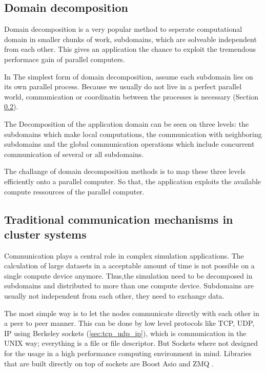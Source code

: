 \subsection{Domain decomposition}
\label{sec:domain_decomposition}
Domain decomposition is a very popular method to seperate
computational domain in smaller chunks of work, subdomains, which are
solveable independent from each other. This gives an application the
chance to exploit the tremendous performace gain of parallel
computers.

In The simplest form of domain decomposition, assume each subdomain
lies on its own parallel process. Because we usually do not live in a
perfect parallel world, communication or coordinatin between the
processes is necessary (Section \ref{sec:communication}).

The Decomposition of the application domain can be seen on three
levels: the subdomains which make local computations, the
communication with neighboring subdomains and the global communication
operations which include concurrent communication of several or all
subdomains.

The challange of domain decomposition methods is to map these three
levels efficiently onto a parallel computer. So that, the application
exploits the available compute ressources of the parallel computer.


\subsection{Traditional communication mechanisms in cluster systems}
\label{sec:communication}
Communication plays a central role in complex simulation
applications. The calculation of large datasets in a acceptable amount
of time is not possible on a single compute device anymore.
Thus,the simulation need to be decomposed in subdomains and
distributed to more than one compute device. Subdomains are usually not
independent from each other, they need to exchange data.

The most simple way is to let the nodes communicate directly with each
other in a peer to peer manner.  This can be done by low level
protocols like TCP, UDP, IP using Berkeley sockets
(\ref{sec:tcp_udp_ip}), which is communication in the UNIX way;
everything is a file or file descriptor. But Sockets where not
designed for the usage in a high performance computing environment in
mind. Libraries that are built directly on top of sockets are Boost
Asio \cite{ref:boost_asio} and ZMQ \cite{ref:ZMQ}.

